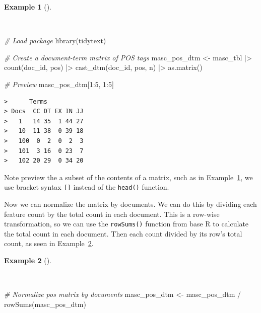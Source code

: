 \documentclass[
  letterpaper,
]{latex/krantz}
\newenvironment{Shaded}{\begin{snugshade}}{\end{snugshade}}
\newcommand{\CommentTok}[1]{\textcolor[rgb]{0.00,0.00,0.00}{\textit{#1}}}
\newcommand{\DecValTok}[1]{\textcolor[rgb]{0.00,0.00,0.00}{#1}}
\newcommand{\FunctionTok}[1]{\textcolor[rgb]{0.00,0.00,0.00}{#1}}
\newcommand{\NormalTok}[1]{\textcolor[rgb]{0.00,0.00,0.00}{#1}}
\newcommand{\OtherTok}[1]{\textcolor[rgb]{0.00,0.00,0.00}{#1}}
\newcommand{\SpecialCharTok}[1]{\textcolor[rgb]{0.00,0.00,0.00}{#1}}
\theoremstyle{definition}
\newtheorem{example}{Example}[chapter]
\theoremstyle{remark}
\begin{document}
\begin{example}[]\protect\hypertarget{exm-eda-masc-dtms}{}\label{exm-eda-masc-dtms}

~

\begin{Shaded}
\begin{Highlighting}[]
\CommentTok{\# Load package}
\FunctionTok{library}\NormalTok{(tidytext)}

\CommentTok{\# Create a document{-}term matrix of POS tags}
\NormalTok{masc\_pos\_dtm }\OtherTok{\textless{}{-}}
\NormalTok{  masc\_tbl }\SpecialCharTok{|\textgreater{}}
  \FunctionTok{count}\NormalTok{(doc\_id, pos) }\SpecialCharTok{|\textgreater{}}
  \FunctionTok{cast\_dtm}\NormalTok{(doc\_id, pos, n) }\SpecialCharTok{|\textgreater{}}
  \FunctionTok{as.matrix}\NormalTok{()}

\CommentTok{\# Preview}
\NormalTok{masc\_pos\_dtm[}\DecValTok{1}\SpecialCharTok{:}\DecValTok{5}\NormalTok{, }\DecValTok{1}\SpecialCharTok{:}\DecValTok{5}\NormalTok{]}
\end{Highlighting}
\end{Shaded}

\begin{verbatim}
>      Terms
> Docs  CC DT EX IN JJ
>   1   14 35  1 44 27
>   10  11 38  0 39 18
>   100  0  2  0  2  3
>   101  3 16  0 23  7
>   102 20 29  0 34 20
\end{verbatim}

\end{example}

Note preview the a subset of the contents of a matrix, such as in
Example~\ref{exm-eda-masc-dtms}, we use bracket syntax \texttt{{[}{]}}
instead of the \texttt{head()} function.

Now we can normalize the matrix by documents. We can do this by dividing
each feature count by the total count in each document. This is a
row-wise transformation, so we can use the \texttt{rowSums()} function
from base R to calculate the total count in each document. Then each
count divided by its row's total count, as seen in
Example~\ref{exm-eda-masc-dtms-normalized}.

\begin{example}[]\protect\hypertarget{exm-eda-masc-dtms-normalized}{}\label{exm-eda-masc-dtms-normalized}

~

\begin{Shaded}
\begin{Highlighting}[]
\CommentTok{\# Normalize pos matrix by documents}
\NormalTok{masc\_pos\_dtm }\OtherTok{\textless{}{-}}
\NormalTok{  masc\_pos\_dtm }\SpecialCharTok{/} \FunctionTok{rowSums}\NormalTok{(masc\_pos\_dtm)}
\end{Highlighting}
\end{Shaded}

\end{example}
\end{document}
